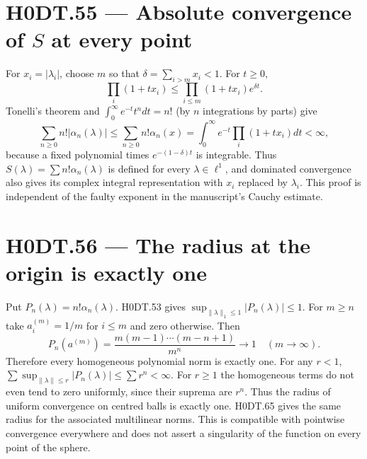 \section*{H0DT.55 --- Absolute convergence of $S$ at every point}
For $x_i=|\lambda_i|$, choose $m$ so that $\delta=\sum_{i>m}x_i<1$. For $t\ge0$,
\[
 \prod_i(1+tx_i)\le\prod_{i\le m}(1+tx_i)e^{\delta t}.
\]
Tonelli's theorem and $\int_0^\infty e^{-t}t^n dt=n!$ (by $n$ integrations by parts) give
\[
 \sum_{n\ge0}n!|\alpha_n(\lambda)|
 \le\sum_{n\ge0}n!\alpha_n(x)
 =\int_0^\infty e^{-t}\prod_i(1+tx_i)dt<\infty,
\]
because a fixed polynomial times $e^{-(1-\delta)t}$ is integrable. Thus $S(\lambda)=\sum n!\alpha_n(\lambda)$ is defined for every $\lambda\in\ell^1$, and dominated convergence also gives its complex integral representation with $x_i$ replaced by $\lambda_i$. This proof is independent of the faulty exponent in the manuscript's Cauchy estimate.

\section*{H0DT.56 --- The radius at the origin is exactly one}
Put $P_n(\lambda)=n!\alpha_n(\lambda)$. H0DT.53 gives $\sup_{\|\lambda\|_1\le1}|P_n(\lambda)|\le1$. For $m\ge n$ take $a_i^{(m)}=1/m$ for $i\le m$ and zero otherwise. Then
\[
 P_n(a^{(m)})=\frac{m(m-1)\cdots(m-n+1)}{m^n}\longrightarrow1
 \quad(m\to\infty).
\]
Therefore every homogeneous polynomial norm is exactly one. For any $r<1$, $\sum\sup_{\|\lambda\|\le r}|P_n(\lambda)|\le\sum r^n<\infty$. For $r\ge1$ the homogeneous terms do not even tend to zero uniformly, since their suprema are $r^n$. Thus the radius of uniform convergence on centred balls is exactly one. H0DT.65 gives the same radius for the associated multilinear norms. This is compatible with pointwise convergence everywhere and does not assert a singularity of the function on every point of the sphere.

